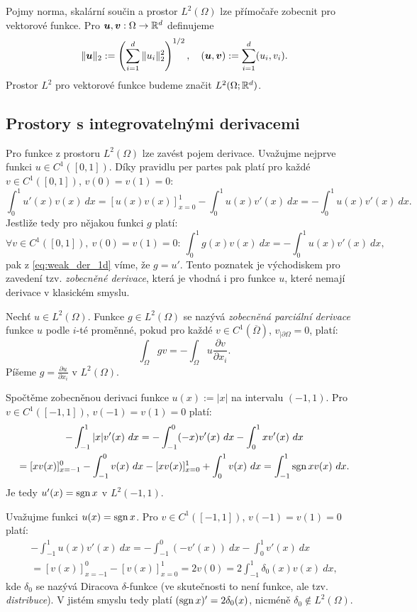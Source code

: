 Pojmy norma, skalární součin a prostor $L^2(\Omega)$ lze přímočaře zobecnit pro vektorové funkce.
Pro $\mathbf{\boldsymbol{u}},\mathbf{\boldsymbol{v}}:\Omega\rightarrow\mathbb R^d$ definujeme
\[ \|\mathbf{\boldsymbol{u}}\|_2 := \left(\sum_{i=1}^d\|u_i\|_2^2\right)^{1/2},\quad (\mathbf{\boldsymbol{u}},\mathbf{\boldsymbol{v}}):=\sum_{i=1}^d(u_i,v_i). \]
Prostor $L^2$ pro vektorové funkce budeme značit $L^2(\Omega;\mathbb R^d)$.





\subsection{Prostory s integrovatelnými derivacemi}

Pro funkce z prostoru $L^2(\Omega)$ lze zavést pojem derivace.
Uvažujme nejprve funkci $u\in C^1([0,1])$.
Díky pravidlu per partes pak platí pro každé $v\in C^1([0,1])$, $v(0)=v(1)=0$:
\begin{equation}
\label{eq:weak_der_1d}
\int_0^1 u'(x)v(x)~dx = [u(x)v(x)]_{x=0}^1 - \int_0^1u(x)v'(x)~dx = - \int_0^1u(x)v'(x)~dx.
\end{equation}
Jestliže tedy pro nějakou funkci $g$ platí:
\[ \forall v\in C^1([0,1]),~v(0)=v(1)=0:~\int_0^1g(x)v(x)~dx=-\int_0^1 u(x)v'(x)~dx, \]
pak z \eqref{eq:weak_der_1d} víme, že $g=u'$.
Tento poznatek je východiskem pro zavedení tzv. \emph{zobecněné derivace}, která je vhodná i pro funkce $u$, které nemají derivace v klasickém smyslu.
\begin{df}
Nechť $u\in L^2(\Omega)$. Funkce $g\in L^2(\Omega)$ se nazývá \emph{zobecněná parciální derivace} funkce $u$ podle $i$-té proměnné, pokud pro každé $v\in C^1(\overline\Omega)$, $v_{|\partial\Omega}=0$, platí:
\[ \int_\Omega gv = -\int_{\Omega} u\frac{\partial v}{\partial x_i}. \]
Píšeme $g=\frac{\partial u}{\partial x_i}$ v $L^2(\Omega)$.
\end{df}
\begin{ex}
Spočtěme zobecněnou derivaci funkce $u(x):=|x|$ na intervalu $(-1,1)$.
Pro $v\in C^1([-1,1])$, $v(-1)=v(1)=0$ platí:
\begin{multline*}
-\int_{-1}^1|x|v'(x)~dx = -\int_{-1}^0(-x)v'(x)~dx - \int_0^1xv'(x)~dx\\
= [xv(x)]_{x=-1}^0 - \int_{-1}^0v(x)~dx - [xv(x)]_{x=0}^1 + \int_0^1v(x)~dx
= \int_{-1}^1\operatorname{sgn} x v(x)~dx.
\end{multline*}
Je tedy $u'(x)=\operatorname{sgn} x$ v $L^2(-1,1)$.
\end{ex}
\begin{ex}
Uvažujme funkci $u(x) = \operatorname{sgn} x$. Pro $v\in C^1([-1,1])$, $v(-1)=v(1)=0$ platí:
\begin{multline*}
 -\int_{-1}^1u(x)v'(x)~dx = -\int_{-1}^0 (-v'(x))~dx - \int_0^1 v'(x)~dx\\
 = [v(x)]_{x=-1}^0 - [v(x)]_{x=0}^1 = 2v(0) = 2\int_{-1}^1\delta_0(x)v(x)~dx,
\end{multline*}
kde $\delta_0$ se nazývá Diracova $\delta$-funkce (ve skutečnosti to není funkce, ale tzv. \emph{distribuce}). V jistém smyslu tedy platí $(\operatorname{sgn} x)'=2\delta_0(x)$, nicméně $\delta_0\notin L^2(\Omega)$.
\end{ex}

